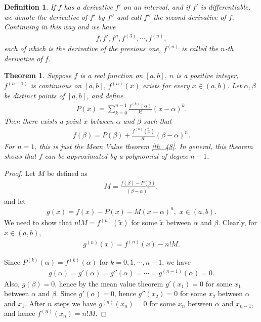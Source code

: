 \documentclass[10pt]{book}
\newtheorem{definition}{Definition}[chapter]
\newtheorem{theorem}{Theorem}[chapter]
\theoremstyle{definition}
\numberwithin{equation}{chapter}
\begin{document}
\begin{definition}
If $f$ has a derivative $f'$ on an interval, and if $f'$ is differentiable, we denote the derivative of $f'$ by $f''$ and call $f''$ the second derivative of $f$. Continuing in this way and we have
\begin{align*}
    f, f', f'', f^{(3)}, \cdots, f^{(n)},
\end{align*}
each of which is the derivative of the previous one, $f^{(n)}$ is called the $n$-th derivative of $f$.
\end{definition}

\medskip

\begin{theorem}
Suppose $f$ is a real function on $[a,b]$, $n$ is a positive integer, $f^{(n-1)}$ is continuous on $[a,b]$, $f^{(n)}(x)$ exists for every $x \in (a,b)$. Let $\alpha, \beta$ be distinct points of $[a,b]$, and define
\begin{align*}
    P(x) = \sum^{n-1}_{k=0} \frac{f^{(k)}(\alpha)}{k!} (x - \alpha)^k.
\end{align*}
Then there exists a point $\widetilde{x}$ between $\alpha$ and $\beta$ such that
\begin{align*}
    f(\beta) = P(\beta) + \frac{f^{(n)}(\widetilde{x})}{n!} (\beta - \alpha)^n.
\end{align*}
For $n = 1$, this is just the Mean Value theorem \ref{th_48}. In general, this theorem shows that $f$ can be approximated by a polynomial of degree $n - 1$.
\end{theorem}
\begin{proof}
Let $M$ be defined as 
\begin{align*}
    M = \frac{f(\beta) - P(\beta)}{(\beta - \alpha)^n},
\end{align*}
and let 
\begin{align*}
    g(x) = f(x) - P(x) - M(x - \alpha)^n, \,\, x \in (a,b).
\end{align*}
We need to show that $n!M = f^{(n)}(\widetilde{x})$ for some $\widetilde{x}$ between $\alpha$ and $\beta$. Clearly, for $x \in (a,b)$,
\begin{align*}
    g^{(n)}(x) = f^{(n)}(x) - n!M.
\end{align*}

Since $P^{(k)}(\alpha) = f^{(k)}(\alpha)$ for $k = 0,1,\cdots,n-1$, we have
\begin{align*}
    g(\alpha) = g'(\alpha) = g''(\alpha) = \cdots = g^{(n-1)}(\alpha) = 0.
\end{align*}
Also, $g(\beta) = 0$, hence by the mean value theorem $g'(x_1) = 0$ for some $x_1$ between $\alpha$ and $\beta$. Since $g'(\alpha) = 0$, hence $g''(x_2) = 0$ for some $x_2$ between $\alpha$ and $x_1$. After $n$ steps we have $g^{(n)}(x_n) = 0$ for some $x_n$ between $\alpha$ and $x_{n-1}$, and hence $f^{(n)}(x_n) = n!M$.
\end{proof}
\end{document}
